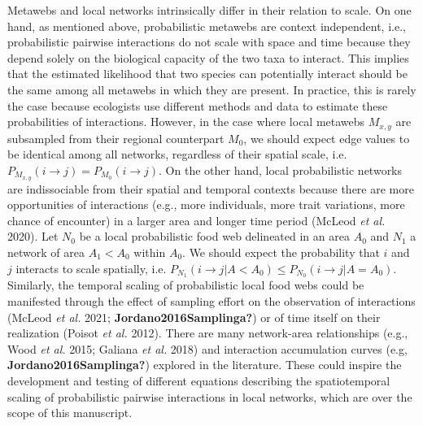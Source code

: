 \documentclass[10pt,oneside]{article}
\begin{document}
Metawebs and local networks intrinsically differ in their relation to
scale. On one hand, as mentioned above, probabilistic metawebs are
context independent, i.e., probabilistic pairwise interactions do not
scale with space and time because they depend solely on the biological
capacity of the two taxa to interact. This implies that the estimated
likelihood that two species can potentially interact should be the same
among all metawebs in which they are present. In practice, this is
rarely the case because ecologists use different methods and data to
estimate these probabilities of interactions. However, in the case where
local metawebs \(M_{x,y}\) are subsampled from their regional
counterpart \(M_0\), we should expect edge values to be identical among
all networks, regardless of their spatial scale,
i.e.~\(P_{M_{x,y}}(i \rightarrow j) = P_{M_0}(i \rightarrow j)\). On the
other hand, local probabilistic networks are indissociable from their
spatial and temporal contexts because there are more opportunities of
interactions (e.g., more individuals, more trait variations, more chance
of encounter) in a larger area and longer time period (McLeod \emph{et
al.} 2020). Let \(N_0\) be a local probabilistic food web delineated in
an area \(A_0\) and \(N_1\) a network of area \(A_1 < A_0\) within
\(A_0\). We should expect the probability that \(i\) and \(j\) interacts
to scale spatially, i.e.
\(P_{N_1}(i \rightarrow j | A < A_0) \le P_{N_0}(i \rightarrow j | A = A_0)\).
Similarly, the temporal scaling of probabilistic local food webs could
be manifested through the effect of sampling effort on the observation
of interactions (McLeod \emph{et al.} 2021;
\textbf{Jordano2016Samplinga?}) or of time itself on their realization
(Poisot \emph{et al.} 2012). There are many network-area relationships
(e.g., Wood \emph{et al.} 2015; Galiana \emph{et al.} 2018) and
interaction accumulation curves (e.g, \textbf{Jordano2016Samplinga?})
explored in the literature. These could inspire the development and
testing of different equations describing the spatiotemporal scaling of
probabilistic pairwise interactions in local networks, which are over
the scope of this manuscript.
\end{document}
